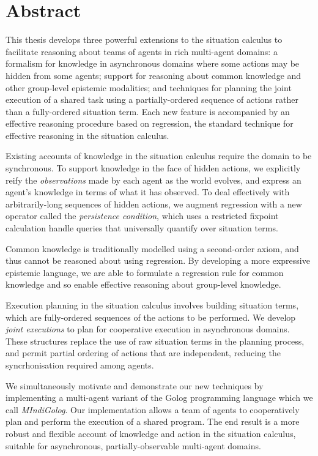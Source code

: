 


\chapter*{Abstract}

This thesis develops three powerful extensions to the situation calculus
to facilitate reasoning about teams of agents in rich multi-agent
domains: a formalism for knowledge in asynchronous domains where some
actions may be hidden from some agents; support for reasoning about
common knowledge and other group-level epistemic modalities; and techniques
for planning the joint execution of a shared task using a partially-ordered
sequence of actions rather than a fully-ordered situation term. Each
new feature is accompanied by an effective reasoning procedure based
on regression, the standard technique for effective reasoning in the
situation calculus.

Existing accounts of knowledge in the situation calculus require the
domain to be synchronous. To support knowledge in the face of hidden
actions, we explicitly reify the \emph{observations} made by each
agent as the world evolves, and express an agent's knowledge in terms
of what it has observed. To deal effectively with arbitrarily-long
sequences of hidden actions, we augment regression with a new operator
called the \emph{persistence condition}, which uses a restricted fixpoint
calculation handle queries that universally quantify over situation
terms.

Common knowledge is traditionally modelled using a second-order axiom,
and thus cannot be reasoned about using regression. By developing
a more expressive epistemic language, we are able to formulate a regression
rule for common knowledge and so enable effective reasoning about
group-level knowledge.

Execution planning in the situation calculus involves building situation
terms, which are fully-ordered sequences of the actions to be performed.
We develop \emph{joint executions} to plan for cooperative execution
in asynchronous domains. These structures replace the use of raw situation
terms in the planning process, and permit partial ordering of actions
that are independent, reducing the syncrhonisation required among
agents.

We simultaneously motivate and demonstrate our new techniques by implementing
a multi-agent variant of the Golog programming language which we call
\emph{MIndiGolog}. Our implementation allows a team of agents to cooperatively
plan and perform the execution of a shared program. The end result
is a more robust and flexible account of knowledge and action in the
situation calculus, suitable for asynchronous, partially-observable
multi-agent domains.

